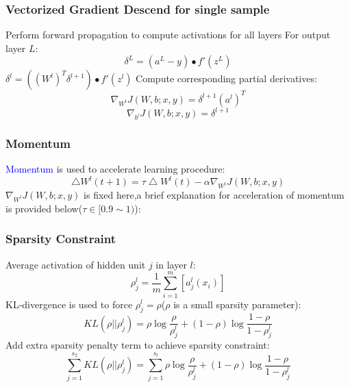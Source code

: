 \documentclass{beamer}
\begin{document}
\begin{CJK*}{UTF8}{gbsn}
\begin{frame}\frametitle{Vectorized Gradient Descend for single sample}
\begin{algorithm}[H]
Perform forward propagation to compute activations for all layers\;
For output layer $L$:
\begin{equation}
\delta^{L}=(a^{L}-y)\bullet f'(z^{L})
\end{equation}
{
    $\delta^l=((W^l)^T\delta^{l+1})\bullet f'(z^l)$\;
}
Compute corresponding partial derivatives:
\begin{equation}
\nabla_{W^l}J(W,b;x,y)=\delta^{l+1}(a^l)^T
\end{equation}
\begin{equation}
\nabla_{b^l}J(W,b;x,y)=\delta^{l+1}
\end{equation}\;
\end{algorithm}
\end{frame}


\begin{frame}\frametitle{Momentum}
\textcolor{blue}{Momentum} is used to accelerate learning procedure:
\begin{equation}
\bigtriangleup W^l(t+1)=\tau\bigtriangleup W^l(t)-\alpha\nabla_{W^l}J(W,b;x,y)
\end{equation}
$\nabla_{W^l}J(W,b;x,y)$ is fixed here,a brief explanation for acceleration of momentum is provided below($\tau\in[0.9\sim 1)$):
\end{frame}


\begin{frame}\frametitle{Sparsity Constraint}
Average activation of hidden unit $j$ in layer $l$:
\begin{equation}
\rho_j^l=\frac{1}{m}\sum_{i=1}^m\left[a_j^l(x_i)\right]
\end{equation}
KL-divergence is used to force $\rho_j^l=\rho$($\rho$ is a small sparsity parameter):
\begin{equation}
KL(\rho||\rho_j^l)=\rho\log\frac{\rho}{\rho_j^l}+(1-\rho)\log\frac{1-\rho}{1-\rho_j^l}
\end{equation}
Add extra sparsity penalty term to achieve sparsity constraint:
\begin{equation}
\sum_{j=1}^{s_2}KL(\rho||\rho_j^l)=\sum_{j=1}^{s_l}\rho\log\frac{\rho}{\rho_j^l}+(1-\rho)\log\frac{1-\rho}{1-\rho_j^l}
\end{equation}
\end{frame}



\end{CJK*}
\end{document}
